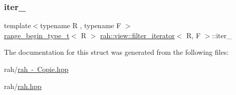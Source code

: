 \subsubsection{\texorpdfstring{iter\_}{iter\_}}
{\footnotesize\ttfamily template$<$typename R , typename F $>$ \\
\mbox{\hyperlink{namespacerah_a28aff4eeddcece6be65ff0b956d32d4a}{range\+\_\+begin\+\_\+type\+\_\+t}}$<$ R $>$ \mbox{\hyperlink{structrah_1_1view_1_1filter__iterator}{rah\+::view\+::filter\+\_\+iterator}}$<$ R, F $>$\+::iter\+\_\+}



The documentation for this struct was generated from the following files\+:\begin{DoxyCompactItemize}
\item 
rah/\mbox{\hyperlink{rah_01-_01_copie_8hpp}{rah -\/ Copie.\+hpp}}\item 
rah/\mbox{\hyperlink{rah_8hpp}{rah.\+hpp}}\end{DoxyCompactItemize}
